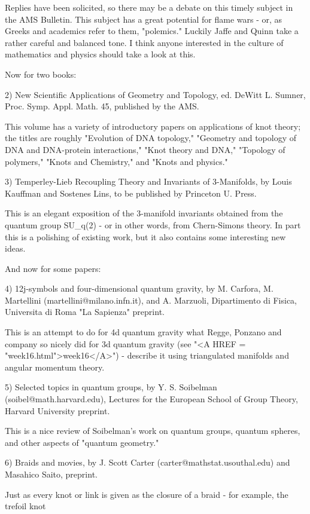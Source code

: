 Replies have been solicited, so there may be a debate on this timely
subject in the AMS Bulletin.  This subject has a great potential for
flame wars - or, as Greeks and academics refer to them, "polemics."  Luckily
Jaffe and Quinn take a rather careful and balanced tone.   I think
anyone interested in the culture of mathematics and physics should take
a look at this.

Now for two books:

2) New Scientific Applications of Geometry and Topology, ed. DeWitt L.
Sumner, Proc. Symp. Appl. Math. 45, published by the AMS.

This volume has a variety of introductory papers on applications of knot
theory; the titles are roughly "Evolution of DNA topology," "Geometry
and topology of DNA and DNA-protein interactions," "Knot theory and
DNA," "Topology of polymers," "Knots and Chemistry," and "Knots and
physics."  

3) Temperley-Lieb Recoupling Theory and Invariants of 3-Manifolds, by
Louis Kauffman and Sostenes Lins, to be published by Princeton U. Press.

This is an elegant exposition of the 3-manifold invariants obtained from the
quantum group SU_q(2) - or in other words, from Chern-Simons theory.  In
part this is a polishing of existing work, but it also contains some
interesting new ideas.

And now for some papers:

4) 12j-symbols and four-dimensional quantum gravity, by M. Carfora, M.
Martellini (martellini@milano.infn.it), and A. Marzuoli, Dipartimento di
Fisica, Universita di Roma "La Sapienza" preprint.

This is an attempt to do for 4d quantum gravity what Regge, Ponzano and
company so nicely did for 3d quantum gravity (see "<A HREF = "week16.html">week16</A>") - describe
it using triangulated manifolds and angular momentum theory.

5) Selected topics in quantum groups, by Y. S. Soibelman
(soibel@math.harvard.edu), Lectures for the European School of Group
Theory, Harvard University preprint.

This is a nice review of Soibelman's work on quantum groups, quantum
spheres, and other aspects of "quantum geometry."

6) Braids and movies, by J. Scott Carter (carter@mathstat.usouthal.edu)
and Masahico Saito, preprint. 

Just as every knot or link is given as the closure of a braid - for
example, the trefoil knot 

